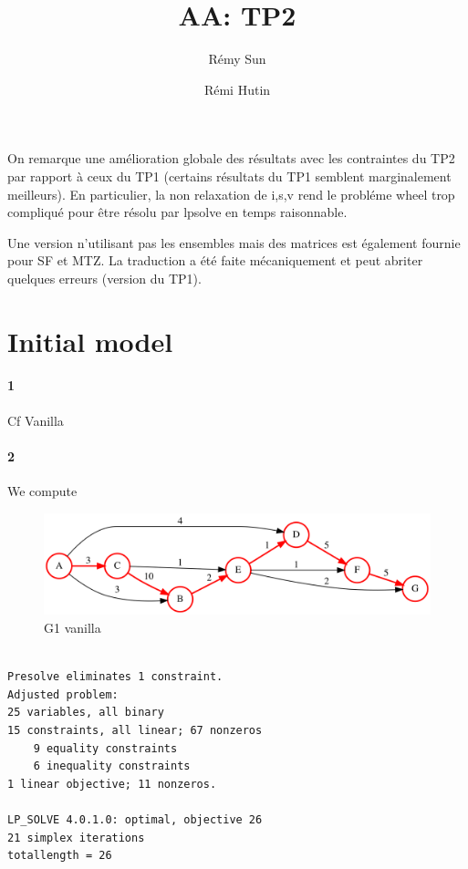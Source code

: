 \documentclass{article}
\author{Rémy Sun \and Rémi Hutin}
\title{AA: TP2}
\begin{document}
\maketitle

On remarque une amélioration globale des résultats avec les contraintes du TP2 par
rapport à ceux du TP1 (certains résultats du TP1 semblent marginalement meilleurs). En particulier, la non relaxation de i,s,v rend le
probléme wheel trop compliqué pour être résolu par lpsolve en temps raisonnable.

Une version n'utilisant pas les ensembles mais des matrices est également
fournie pour SF et MTZ. La traduction a été faite mécaniquement et peut abriter
quelques erreurs (version du TP1).

\section{Initial model}

\paragraph{1}

Cf Vanilla

\paragraph{2}

We compute

\begin{figure}[H]
  \centering
  \includegraphics[scale=0.3]{graph/vanilla_G1}
  \caption{G1 vanilla}
\end{figure}

\begin{lstlisting}

Presolve eliminates 1 constraint.
Adjusted problem:
25 variables, all binary
15 constraints, all linear; 67 nonzeros
	9 equality constraints
	6 inequality constraints
1 linear objective; 11 nonzeros.

LP_SOLVE 4.0.1.0: optimal, objective 26
21 simplex iterations
totallength = 26

\end{lstlisting}
\end{document}
